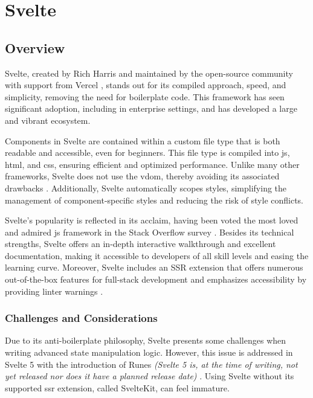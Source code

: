 \section{Svelte}
\label{sec:svelte}

\subsection{Overview}
\label{subsec:svelte:overview}

Svelte, created by Rich Harris and maintained by the open-source community with support from Vercel \cite{vercel:welcomes_rich}, stands out for its compiled approach, speed, and simplicity, removing the need for boilerplate code. This framework has seen significant adoption, including in enterprise settings, and has developed a large and vibrant ecosystem.

Components in Svelte are contained within a custom file type that is both readable and accessible, even for beginners. This file type is compiled into \acrshort{js}, \acrshort{html}, and \acrshort{css}, ensuring efficient and optimized performance. Unlike many other frameworks, Svelte does not use the \acrshort{vdom}, thereby avoiding its associated drawbacks \cite{svelte:vdom}. Additionally, Svelte automatically scopes styles, simplifying the management of component-specific styles and reducing the risk of style conflicts. \cite{svelte:components}

Svelte's popularity is reflected in its acclaim, having been voted the most loved and admired \acrshort{js} framework in the Stack Overflow survey \cite{stackoverflow:survey_2023}. Besides its technical strengths, Svelte offers an in-depth interactive walkthrough and excellent documentation, making it accessible to developers of all skill levels and easing the learning curve. Moreover, Svelte includes an SSR extension that offers numerous out-of-the-box features for full-stack development and emphasizes accessibility by providing linter warnings \cite{svelte:kit,svelte:a11y}.

\subsubsection{Challenges and Considerations}
\label{subsec:svelte:challenges}

Due to its anti-boilerplate philosophy, Svelte presents some challenges when writing advanced state manipulation logic. However, this issue is addressed in Svelte 5 with the introduction of Runes \textit{(Svelte 5 is, at the time of writing, not yet released nor does it have a planned release date)} \cite{svelte:runes}. Using Svelte without its supported \acrshort{ssr} extension, called SvelteKit, can feel immature.

